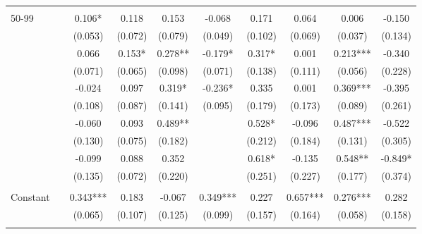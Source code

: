 \begin{tabular*}{\linewidth}{@{\extracolsep{\fill} } llcccccccc}
&&&&&&&&&\\%
\multirow{2}{*}{\hspace{0.2cm}50{-}99}&&0.106*&0.118&0.153&{-}0.068&0.171&0.064&0.006&{-}0.150\\%
&&(0.053)&(0.072)&(0.079)&(0.049)&(0.102)&(0.069)&(0.037)&(0.134)\\%
\arrayrulecolor{white}%
\hline%
\arrayrulecolor{white}%
\hline%
\arrayrulecolor{white}%
\hline%
\arrayrulecolor{white}%
\hline%
\arrayrulecolor{white}%
\hline%
\multirow{2}{*}{\hspace{0.2cm}100{-}199}&&0.066&0.153*&0.278**&{-}0.179*&0.317*&0.001&0.213***&{-}0.340\\%
&&(0.071)&(0.065)&(0.098)&(0.071)&(0.138)&(0.111)&(0.056)&(0.228)\\%
\arrayrulecolor{white}%
\hline%
\arrayrulecolor{white}%
\hline%
\arrayrulecolor{white}%
\hline%
\arrayrulecolor{white}%
\hline%
\arrayrulecolor{white}%
\hline%
\multirow{2}{*}{\hspace{0.2cm}200{-}299}&&{-}0.024&0.097&0.319*&{-}0.236*&0.335&0.001&0.369***&{-}0.395\\%
&&(0.108)&(0.087)&(0.141)&(0.095)&(0.179)&(0.173)&(0.089)&(0.261)\\%
\arrayrulecolor{white}%
\hline%
\arrayrulecolor{white}%
\hline%
\arrayrulecolor{white}%
\hline%
\arrayrulecolor{white}%
\hline%
\arrayrulecolor{white}%
\hline%
\multirow{2}{*}{\hspace{0.2cm}300{-}399}&&{-}0.060&0.093&0.489**&&0.528*&{-}0.096&0.487***&{-}0.522\\%
&&(0.130)&(0.075)&(0.182)&&(0.212)&(0.184)&(0.131)&(0.305)\\%
\arrayrulecolor{white}%
\hline%
\arrayrulecolor{white}%
\hline%
\arrayrulecolor{white}%
\hline%
\arrayrulecolor{white}%
\hline%
\arrayrulecolor{white}%
\hline%
\multirow{2}{*}{\hspace{0.2cm}400+}&&{-}0.099&0.088&0.352&&0.618*&{-}0.135&0.548**&{-}0.849*\\%
&&(0.135)&(0.072)&(0.220)&&(0.251)&(0.227)&(0.177)&(0.374)\\%
\arrayrulecolor{white}%
\hline%
\arrayrulecolor{white}%
\hline%
\arrayrulecolor{white}%
\hline%
\arrayrulecolor{white}%
\hline%
\arrayrulecolor{white}%
\hline%
&&&&&&&&&\\%
\multirow{2}{*}{Constant}&&0.343***&0.183&{-}0.067&0.349***&0.227&0.657***&0.276***&0.282\\%
&&(0.065)&(0.107)&(0.125)&(0.099)&(0.157)&(0.164)&(0.058)&(0.158)\\%
\arrayrulecolor{white}%

\end{tabular*}
